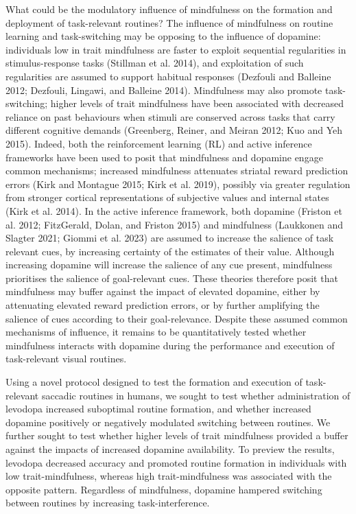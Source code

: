 \documentclass{article}
\begin{document}
What could be the modulatory influence of mindfulness on the formation
and deployment of task-relevant routines? The influence of mindfulness
on routine learning and task-switching may be opposing to the influence
of dopamine: individuals low in trait mindfulness are faster to exploit
sequential regularities in stimulus-response tasks (Stillman et al.
2014), and exploitation of such regularities are assumed to support
habitual responses (Dezfouli and Balleine 2012; Dezfouli, Lingawi, and
Balleine 2014). Mindfulness may also promote task-switching; higher
levels of trait mindfulness have been associated with decreased reliance
on past behaviours when stimuli are conserved across tasks that carry
different cognitive demands (Greenberg, Reiner, and Meiran 2012; Kuo and
Yeh 2015). Indeed, both the reinforcement learning (RL) and active
inference frameworks have been used to posit that mindfulness and
dopamine engage common mechanisms; increased mindfulness attenuates
striatal reward prediction errors (Kirk and Montague 2015; Kirk et al.
2019), possibly via greater regulation from stronger cortical
representations of subjective values and internal states (Kirk et al.
2014). In the active inference framework, both dopamine (Friston et al.
2012; FitzGerald, Dolan, and Friston 2015) and mindfulness (Laukkonen
and Slagter 2021; Giommi et al. 2023) are assumed to increase the
salience of task relevant cues, by increasing certainty of the estimates
of their value. Although increasing dopamine will increase the salience
of any cue present, mindfulness prioritises the salience of
goal-relevant cues. These theories therefore posit that mindfulness may
buffer against the impact of elevated dopamine, either by attenuating
elevated reward prediction errors, or by further amplifying the salience
of cues according to their goal-relevance. Despite these assumed common
mechanisms of influence, it remains to be quantitatively tested whether
mindfulness interacts with dopamine during the performance and execution
of task-relevant visual routines.

Using a novel protocol designed to test the formation and execution of
task-relevant saccadic routines in humans, we sought to test whether
administration of levodopa increased suboptimal routine formation, and
whether increased dopamine positively or negatively modulated switching
between routines. We further sought to test whether higher levels of
trait mindfulness provided a buffer against the impacts of increased
dopamine availability. To preview the results, levodopa decreased
accuracy and promoted routine formation in individuals with low
trait-mindfulness, whereas high trait-mindfulness was associated with
the opposite pattern. Regardless of mindfulness, dopamine hampered
switching between routines by increasing task-interference.
\end{document}
